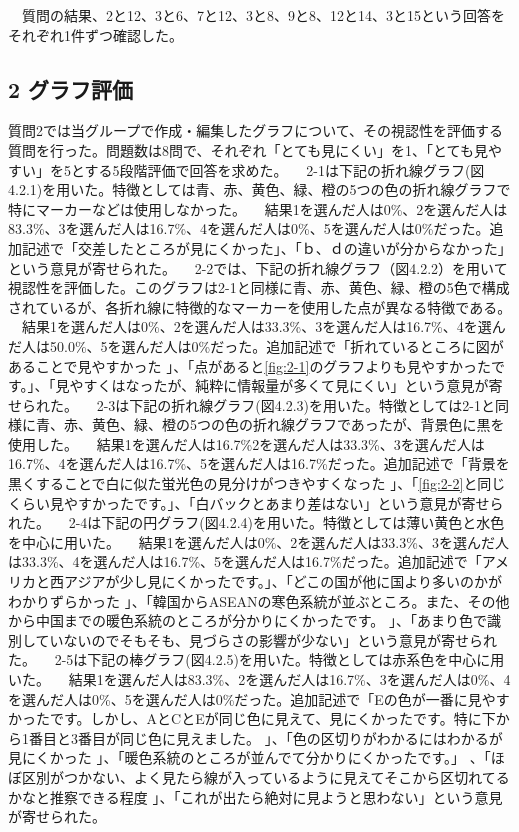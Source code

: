 　質問の結果、2と12、3と6、7と12、3と8、9と8、12と14、3と15という回答をそれぞれ1件ずつ確認した。
\subsection{2 グラフ評価}
質問2では当グループで作成・編集したグラフについて、その視認性を評価する質問を行った。問題数は8問で、それぞれ「とても見にくい」を1、「とても見やすい」を5とする5段階評価で回答を求めた。
　2-1は下記の折れ線グラフ(図4.2.1)を用いた。特徴としては青、赤、黄色、緑、橙の5つの色の折れ線グラフで特にマーカーなどは使用しなかった。
　結果1を選んだ人は0\%、2を選んだ人は83.3\%、3を選んだ人は16.7\%、4を選んだ人は0\%、5を選んだ人は0\%だった。追加記述で「交差したところが見にくかった」、「ｂ、ｄの違いが分からなかった」という意見が寄せられた。
　2-2では、下記の折れ線グラフ（図4.2.2）を用いて視認性を評価した。このグラフは2-1と同様に青、赤、黄色、緑、橙の5色で構成されているが、各折れ線に特徴的なマーカーを使用した点が異なる特徴である。
　結果1を選んだ人は0\%、2を選んだ人は33.3\%、3を選んだ人は16.7\%、4を選んだ人は50.0\%、5を選んだ人は0\%だった。追加記述で「折れているところに図があることで見やすかった 」、「点があると\ref{fig:2-1}のグラフよりも見やすかったです。」、「見やすくはなったが、純粋に情報量が多くて見にくい」という意見が寄せられた。
　2-3は下記の折れ線グラフ(図4.2.3)を用いた。特徴としては2-1と同様に青、赤、黄色、緑、橙の5つの色の折れ線グラフであったが、背景色に黒を使用した。
　結果1を選んだ人は16.7\%2を選んだ人は33.3\%、3を選んだ人は16.7\%、4を選んだ人は16.7\%、5を選んだ人は16.7\%だった。追加記述で「背景を黒くすることで白に似た蛍光色の見分けがつきやすくなった 」、「\ref{fig:2-2}と同じくらい見やすかったです。」、「白バックとあまり差はない」という意見が寄せられた。
　2-4は下記の円グラフ(図4.2.4)を用いた。特徴としては薄い黄色と水色を中心に用いた。
　結果1を選んだ人は0\%、2を選んだ人は33.3\%、3を選んだ人は33.3\%、4を選んだ人は16.7\%、5を選んだ人は16.7\%だった。追加記述で「アメリカと西アジアが少し見にくかったです。」、「どこの国が他に国より多いのかがわかりずらかった 」、「韓国からASEANの寒色系統が並ぶところ。また、その他から中国までの暖色系統のところが分かりにくかったです。 」、「あまり色で識別していないのでそもそも、見づらさの影響が少ない」という意見が寄せられた。
　2-5は下記の棒グラフ(図4.2.5)を用いた。特徴としては赤系色を中心に用いた。
　結果1を選んだ人は83.3\%、2を選んだ人は16.7\%、3を選んだ人は0\%、4を選んだ人は0\%、5を選んだ人は0\%だった。追加記述で「Eの色が一番に見やすかったです。しかし、AとCとEが同じ色に見えて、見にくかったです。特に下から1番目と3番目が同じ色に見えました。 」、「色の区切りがわかるにはわかるが見にくかった 」、「暖色系統のところが並んでて分かりにくかったです。」 、「ほぼ区別がつかない、よく見たら線が入っているように見えてそこから区切れてるかなと推察できる程度 」、「これが出たら絶対に見ようと思わない」という意見が寄せられた。
